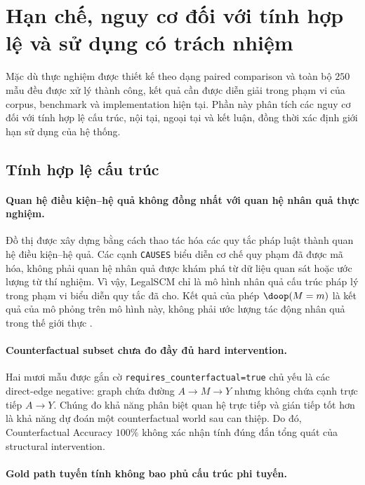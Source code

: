 \section{Hạn chế, nguy cơ đối với tính hợp lệ và sử dụng có trách nhiệm}
\label{sec:limitations}

Mặc dù thực nghiệm được thiết kế theo dạng paired comparison và toàn bộ
$250$ mẫu đều được xử lý thành công, kết quả cần được diễn giải trong phạm
vi của corpus, benchmark và implementation hiện tại. Phần này phân tích các
nguy cơ đối với tính hợp lệ cấu trúc, nội tại, ngoại tại và kết luận, đồng
thời xác định giới hạn sử dụng của hệ thống.

\subsection{Tính hợp lệ cấu trúc}

\paragraph{Quan hệ điều kiện--hệ quả không đồng nhất với quan hệ nhân quả
thực nghiệm.}

Đồ thị được xây dựng bằng cách thao tác hóa các quy tắc pháp luật thành quan
hệ điều kiện--hệ quả. Các cạnh \texttt{CAUSES} biểu diễn cơ chế quy phạm đã
được mã hóa, không phải quan hệ nhân quả được khám phá từ dữ liệu quan sát
hoặc ước lượng từ thí nghiệm. Vì vậy, LegalSCM chỉ là mô hình nhân quả cấu
trúc pháp lý trong phạm vi biểu diễn quy tắc đã cho. Kết quả của phép
$\doop(M=m)$ là kết quả của mô phỏng trên mô hình này, không phải ước lượng
tác động nhân quả trong thế giới thực \cite{pearl2009causality}.

\paragraph{Counterfactual subset chưa đo đầy đủ hard intervention.}

Hai mươi mẫu được gắn cờ \texttt{requires\_counterfactual=true} chủ yếu là
các direct-edge negative: graph chứa đường $A\rightarrow M\rightarrow Y$
nhưng không chứa cạnh trực tiếp $A\rightarrow Y$. Chúng đo khả năng phân
biệt quan hệ trực tiếp và gián tiếp tốt hơn là khả năng dự đoán một
counterfactual world sau can thiệp. Do đó, Counterfactual Accuracy
$100\%$ không xác nhận tính đúng đắn tổng quát của structural intervention.

\paragraph{Gold path tuyến tính không bao phủ cấu trúc phi tuyến.}

